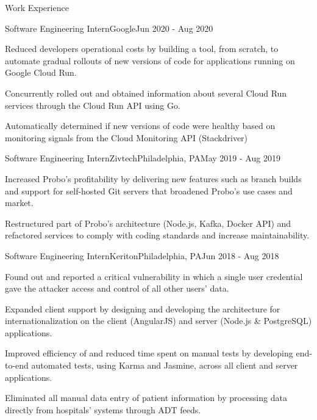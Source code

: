 \documentclass{resume} %
\begin{document}
\begin{rSection}{Work Experience}

\begin{rSubsection}{Software Engineering Intern}{Google}{}{Jun 2020 - Aug 2020}
\item Reduced developers operational costs by building a tool, from scratch, to automate gradual rollouts of new versions of code for applications running on Google Cloud Run.
\item Concurrently rolled out and obtained information about several Cloud Run services through the Cloud Run API using Go.
\item Automatically determined if new versions of code were healthy based on monitoring signals from the Cloud Monitoring API (Stackdriver)
\end{rSubsection}


\begin{rSubsection}{Software Engineering Intern}{Zivtech}{Philadelphia, PA}{May 2019 - Aug 2019}
\item Increased Probo's profitability by delivering new features such as branch builds and support for self-hosted Git servers that broadened Probo’s use cases and market.
\item Restructured part of Probo's architecture (Node.js, Kafka, Docker API) and refactored services to comply with coding standards and increase maintainability.
\end{rSubsection}


\begin{rSubsection}{Software Engineering Intern}{Keriton}{Philadelphia, PA}{Jun 2018 - Aug 2018}
\item Found out and reported a critical vulnerability in which a single user credential gave the attacker access and control of all other users' data.
\item Expanded client support by designing and developing the architecture for internationalization on the client (AngularJS) and server (Node.js \& PostgreSQL) applications.
\item Improved efficiency of and reduced time spent on manual tests by developing end-to-end automated tests, using Karma and Jasmine, across all client and server applications.
\item Eliminated all manual data entry of patient information by processing data directly from hospitals' systems through ADT feeds.
\end{rSubsection}

\end{rSection}
\end{document}

